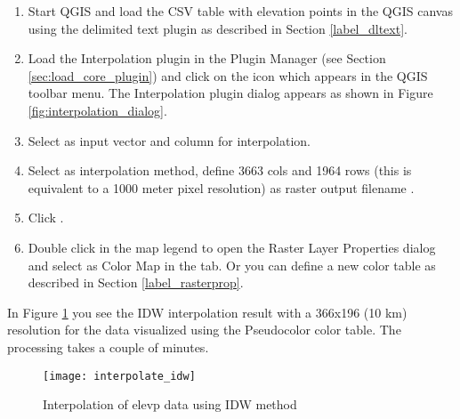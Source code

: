 \begin{enumerate}
  \item Start QGIS and load the  CSV table with elevation points in the QGIS 
  canvas using the delimited text plugin as described in Section \ref{label_dltext}. 
  \item Load the Interpolation plugin in the Plugin Manager (see Section 
  \ref{sec:load_core_plugin}) and click on the  
  icon which appears in the QGIS toolbar menu. The Interpolation plugin dialog appears as shown in Figure \ref{fig:interpolation_dialog}.
  \item Select  as input vector and column  for 
  interpolation.
  \item Select  as interpolation method, define 
  3663 cols and 1964 rows (this is equivalent to a 1000 meter pixel resolution) as raster 
  output filename .
  \item Click .
  \item Double click  in the map legend to open the Raster Layer Properties 
  dialog and select  as Color Map in the  tab. Or you 
  can define a new color table as described in Section \ref{label_rasterprop}.
\end{enumerate}

In Figure \ref{fig:interpolation_idw} you see the IDW interpolation result with a 366x196 (10 km) resolution 
for the  data visualized using the Pseudocolor color table. The processing takes a couple 
of minutes.

\begin{figure}[ht]
   \begin{center}
   \caption{Interpolation of elevp data using IDW method \nixcaption}\label{fig:interpolation_idw}\smallskip
   \texttt{[image: interpolate\_idw]}
\end{center}  
\end{figure}

\newpage



